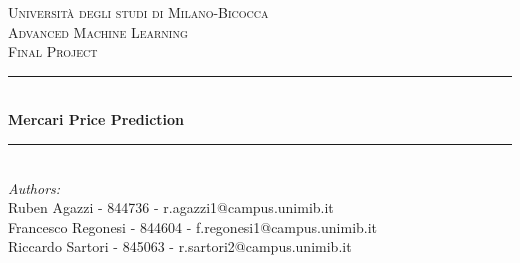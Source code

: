 \begin{titlepage}

\newcommand{\HRule}{\rule{\linewidth}{0.5mm}} %

\center %
 

\textsc{\LARGE Università degli studi di Milano-Bicocca}\\[1cm] %
\textsc{\Large Advanced Machine Learning }\\[0.3cm] %
\textsc{\large Final Project}\\[0.1cm] %


\HRule \\[0.4cm]
{ \huge \bfseries Mercari Price Prediction}\\[0.4cm] %
\HRule \\[1.5cm]
 

\large
\emph{Authors:}\\
Ruben Agazzi - 844736 - r.agazzi1@campus.unimib.it \\   
Francesco Regonesi - 844604 - f.regonesi1@campus.unimib.it   \\
Riccardo Sartori - 845063 - r.sartori2@campus.unimib.it   \\[0.7cm]




\end{titlepage}
